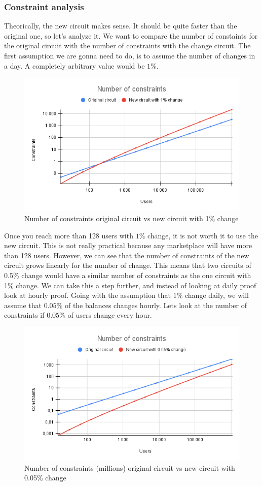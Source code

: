 \subsubsection{Constraint analysis}
Theorically, the new circuit makes sense. It should be quite faster than the original one, so let's analyze it.
We want to compare the number of constaints for the original circuit with the number of constraints with the change circuit.
The first assumption we are gonna need to do, is to assume the number of changes in a day. A completely arbitrary value would be $1\%$.
\begin{figure}[H]
   \centering
   \includegraphics[width=130mm]{Number of constraints.png}
   \caption{Number of constraints original circuit vs new circuit with 1\% change}
   \label{overflow}
   \end{figure}
Once you reach more than 128 users with $1\%$ change, it is not worth it to use the new circuit. 
This is not really practical because any marketplace will have more than 128 users.
However, we can see that the number of constraints of the new circuit grows linearly for the number of change.
This means that two circuits of 0.5\% change would have a similar number of constraints as the one circuit with 1\% change.
We can take this a step further, and instead of looking at daily proof look at hourly proof.
Going with the assumption that $1\%$ change daily, we will assume that $0.05\%$ of the balances changes hourly.
Lets look at the number of constraints if $0.05\%$ of users change every hour.
\begin{figure}[H]
   \centering
   \includegraphics[width=130mm]{Number of constraints .05.png}
   \caption{Number of constraints (millions)  original circuit vs new circuit with 0.05\% change}
   \label{overflow}
   \end{figure}
